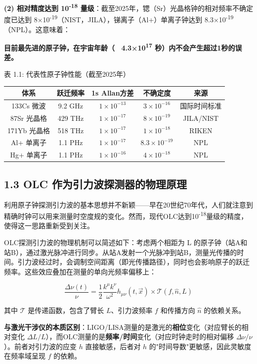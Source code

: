\documentclass[12pt,a4paper]{article}
\begin{document}
\textbf{(2) 相对精度达到 10\textsuperscript{-18} 量级}：截至2025年，锶（Sr）光晶格钟的相对频率不确定度已达到 8×10\textsuperscript{-19}（NIST，JILA），锑离子（Al+）单离子钟达到 8.3×10\textsuperscript{-19}（NPL）\cite{ref6}。这意味着：

\textbf{目前最先进的原子钟，在宇宙年龄（~ 4.3×10\textsuperscript{17} 秒）内不会产生超过1秒的误差。}

表 1.1: 代表性原子钟性能（截至2025年）

\begin{tabular}{|c|c|c|c|c|}
\hline
体系 & 跃迁频率 & 1s Allan方差 & 不确定度 & 来源 \\
\hline
133Cs 微波 & 9.2 GHz & $1\times 10^{-13}$ & $3\times 10^{-16}$ & 国际时间标准 \\
87Sr 光晶格 & 429 THz & $1\times 10^{-17}$ & $8\times 10^{-19}$ & JILA/NIST \\
171Yb 光晶格 & 518 THz & $1\times 10^{-17}$ & $1\times 10^{-18}$ & RIKEN \\
Al+ 单离子 & 1.1 PHz & $1\times 10^{-17}$ & $8.3\times 10^{-19}$ & NPL \\
Hg+ 单离子 & 1.1 PHz & $1\times 10^{-16}$ & $4\times 10^{-18}$ & NPL \\
\hline
\end{tabular}


\subsection{1.3 OLC 作为引力波探测器的物理原理}


利用原子钟探测引力波的基本思想并不新颖——早在20世纪70年代，人们就注意到精确时钟可以用来测量时空度规的变化。然而，现代OLC达到10\textsuperscript{-18}量级的精度，使得这一思路重新受到关注。

OLC探测引力波的物理机制可以简述如下：考虑两个相距为 L 的原子钟（站A和站B），通过激光脉冲进行同步。从站A发射一个光脉冲到站B，测量光传播的时间。引力波经过时，会调制空间距离（即光传播路径），同时也会影响原子的跃迁频率。这些效应叠加在测量的单向光频率偏移上：

$$\frac{\Delta\nu(t)}{\nu} = \frac{1}{2}\frac{k^\mu k^\nu}{\omega^2} h_{\mu\nu}(t, \vec{x}) \times \mathcal{T}(f, \hat{n}, L)$$

其中 $\mathcal{T}$ 是传递函数，包含了臂长 $L$、引力波频率 $f$ 和传播方向 $\hat{n}$ 的依赖关系。

\textbf{与激光干涉仪的本质区别}：LIGO/LISA测量的是激光的\textbf{相位}变化（对应臂长的相对变化 $\Delta L/L$），而OLC测量的是\textbf{频率/时间}变化（对应时钟走时的相对偏移 $\Delta\nu/\nu$）。前者对引力波的应变 $h$ 直接敏感，后者对 $h$ 的"时间导数"更敏感，因此灵敏度在频率域呈现 $f$ 的依赖。
\end{document}
